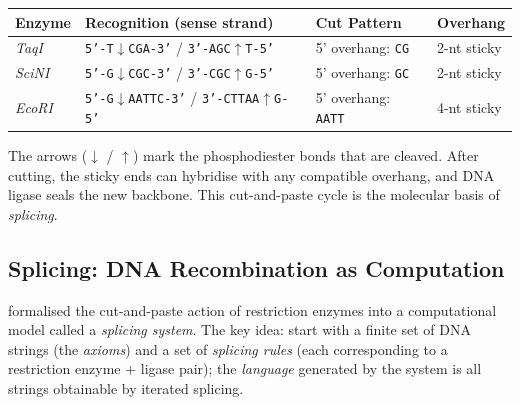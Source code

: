 \begin{center}
\renewcommand{\arraystretch}{1.3}
\begin{tabular}{llll}
\toprule
\textbf{Enzyme} & \textbf{Recognition (sense strand)} & \textbf{Cut Pattern} & \textbf{Overhang} \\
\midrule
\emph{TaqI}  & \texttt{5'-T{$\downarrow$}CGA-3'} / \texttt{3'-AGC{$\uparrow$}T-5'} & 5' overhang: \texttt{CG} & 2-nt sticky \\
\emph{SciNI} & \texttt{5'-G{$\downarrow$}CGC-3'} / \texttt{3'-CGC{$\uparrow$}G-5'} & 5' overhang: \texttt{GC} & 2-nt sticky \\
\emph{EcoRI} & \texttt{5'-G{$\downarrow$}AATTC-3'} / \texttt{3'-CTTAA{$\uparrow$}G-5'} & 5' overhang: \texttt{AATT} & 4-nt sticky \\
\bottomrule
\end{tabular}
\end{center}

The arrows ($\downarrow$ / $\uparrow$) mark the phosphodiester bonds that are cleaved.  After cutting, the sticky ends can hybridise with any compatible overhang, and DNA ligase seals the new backbone.  This cut-and-paste cycle is the molecular basis of \emph{splicing}.

\subsection{Splicing: DNA Recombination as Computation}

\citet{head1987} formalised the cut-and-paste action of restriction enzymes into a computational model called a \emph{splicing system}.  The key idea: start with a finite set of DNA strings (the \emph{axioms}) and a set of \emph{splicing rules} (each corresponding to a restriction enzyme + ligase pair); the \emph{language} generated by the system is all strings obtainable by iterated splicing.


